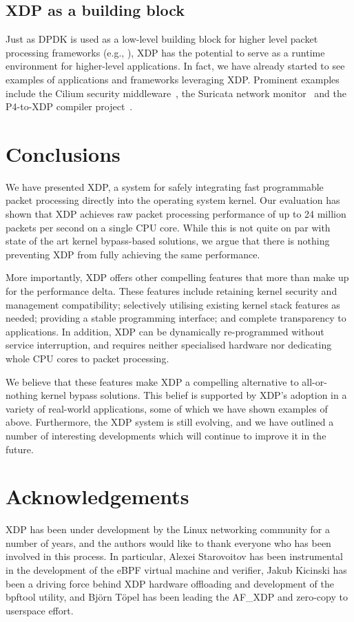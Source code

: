 \documentclass[sigconf]{acmart}
\begin{document}
\subsection{XDP as a building block}
\label{sec:xdp-building-block}

Just as DPDK is used as a low-level building block for higher level packet
processing frameworks (e.g., \cite{linguaglossa2017high}), XDP has the potential
to serve as a runtime environment for higher-level applications. In fact, we
have already started to see examples of applications and frameworks leveraging
XDP. Prominent examples include the Cilium security middleware~\cite{cilium},
the Suricata network monitor~\cite{suricata} and the P4-to-XDP compiler
project~\cite{p4xdp}.

\section{Conclusions}
\label{sec:conclusion}
We have presented XDP, a system for safely integrating fast programmable packet
processing directly into the operating system kernel. Our evaluation has shown
that XDP achieves raw packet processing performance of up to 24 million packets
per second on a single CPU core. While this is not quite on par with state of
the art kernel bypass-based solutions, we argue that there is nothing preventing
XDP from fully achieving the same performance.

More importantly, XDP offers other compelling features that more than make up
for the performance delta. These features include retaining kernel security and
management compatibility; selectively utilising existing kernel stack features
as needed; providing a stable programming interface; and complete transparency
to applications. In addition, XDP can be dynamically re-programmed without
service interruption, and requires neither specialised hardware nor dedicating
whole CPU cores to packet processing.

We believe that these features make XDP a compelling alternative to
all-or-nothing kernel bypass solutions. This belief is supported by XDP's
adoption in a variety of real-world applications, some of which we have shown
examples of above. Furthermore, the XDP system is still evolving, and we have
outlined a number of interesting developments which will continue to improve it
in the future.

\section*{Acknowledgements}
\label{sec:acknowledgements}
XDP has been under development by the Linux networking community for a number of
years, and the authors would like to thank everyone who has been involved in
this process. In particular, Alexei Starovoitov has been instrumental in the
development of the eBPF virtual machine and verifier, Jakub Kicinski has been a
driving force behind XDP hardware offloading and development of the bpftool
utility, and Björn Töpel has been leading the AF\_XDP and zero-copy to userspace
effort.




\end{document}
